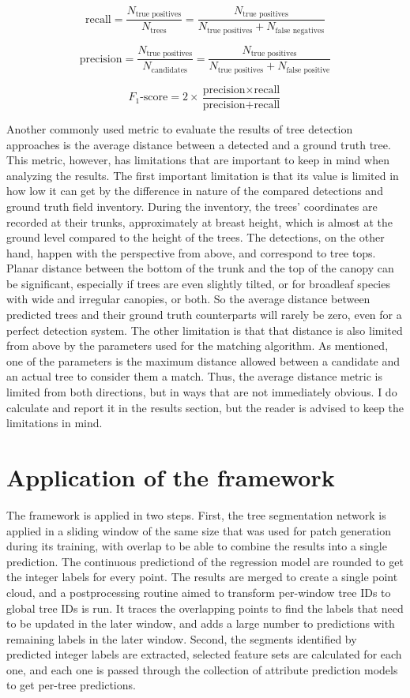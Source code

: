 $$
\text{recall} =
\frac{N_{\text{true positives}}}{N_\text{trees}} =
\frac{N_{\text{true positives}}}{N_{\text{true positives}} + N_{\text{false negatives}}}
$$

$$
\text{precision} =
\frac{N_{\text{true positives}}}{N_\text{candidates}} =
\frac{N_{\text{true positives}}}{N_{\text{true positives}} + N_{\text{false positive}}}
$$

$$
F_1\text{-score} = 2 \times \frac{\text{precision} \times \text{recall}}{\text{precision} + \text{recall}}
$$

Another commonly used metric to evaluate the results of tree detection approaches is the average distance between a detected and a ground truth tree.
This metric, however, has limitations that are important to keep in mind when analyzing the results.
The first important limitation is that its value is limited in how low it can get by the difference in nature of the compared detections and ground truth field inventory.
During the inventory, the trees' coordinates are recorded at their trunks, approximately at breast height, which is almost at the ground level compared to the height of the trees.
The detections, on the other hand, happen with the perspective from above, and correspond to tree tops.
Planar distance between the bottom of the trunk and the top of the canopy can be significant, especially if trees are even slightly tilted, or for broadleaf species with wide and irregular canopies, or both.
So the average distance between predicted trees and their ground truth counterparts will rarely be zero, even for a perfect detection system.
The other limitation is that that distance is also limited from above by the parameters used for the matching algorithm.
As mentioned, one of the parameters is the maximum distance allowed between a candidate and an actual tree to consider them a match.
Thus, the average distance metric is limited from both directions, but in ways that are not immediately obvious.
I do calculate and report it in the results section, but the reader is advised to keep the limitations in mind.

\section{Application of the framework}

The framework is applied in two steps.
First, the tree segmentation network is applied in a sliding window of the same size that was used for patch generation during its training, with overlap to be able to combine the results into a single prediction.
The continuous predictiond of the regression model are rounded to get the integer labels for every point.
The results are merged to create a single point cloud, and a postprocessing routine aimed to transform per-window tree IDs to global tree IDs is run.
It traces the overlapping points to find the labels that need to be updated in the later window, and adds a large number to predictions with remaining labels in the later window.
Second, the segments identified by predicted integer labels are extracted, selected feature sets are calculated for each one, and each one is passed through the collection of attribute prediction models to get per-tree predictions.

